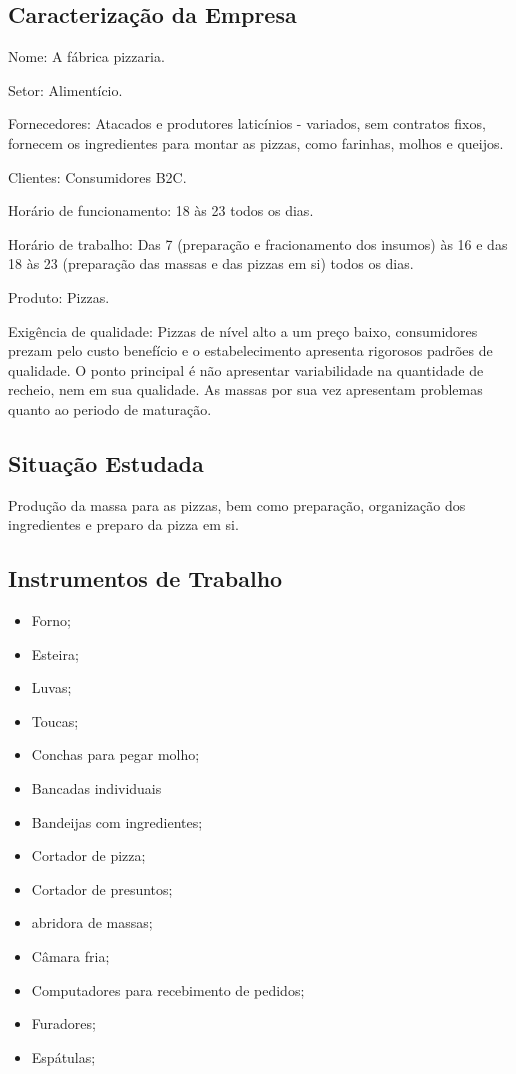 \documentclass[11pt]{article}
\begin{document}
\subsection{Caracterização da Empresa}

Nome: A fábrica pizzaria.

Setor: Alimentício.


Fornecedores: Atacados e produtores laticínios - variados, sem contratos fixos, fornecem os ingredientes para montar as pizzas, como farinhas, molhos e queijos.

Clientes: Consumidores B2C.

Horário de funcionamento: 18 às 23 todos os dias. 

Horário de trabalho: Das 7 (preparação e fracionamento dos insumos) às 16 e  das 18 às 23 (preparação das massas e das pizzas em si) todos os dias.

Produto: Pizzas.

Exigência de qualidade: Pizzas de nível alto a um preço baixo, consumidores prezam pelo custo benefício e o estabelecimento apresenta rigorosos padrões de qualidade. O ponto principal é não apresentar variabilidade na quantidade de recheio, nem em sua qualidade. As massas por sua vez apresentam problemas quanto ao periodo de maturação. 


\subsection{Situação Estudada}

Produção da massa para as pizzas, bem como preparação, organização dos ingredientes e preparo da pizza em si.


\subsection{Instrumentos de Trabalho}

\begin{itemize}
    \item Forno; 
    \item Esteira;
    \item Luvas;
    \item Toucas;
    \item Conchas para pegar molho;
    \item Bancadas individuais
    \item Bandeijas com ingredientes;
    \item Cortador de pizza;
    \item Cortador de presuntos;
    \item abridora de massas;
    \item Câmara fria;
    \item Computadores para recebimento de pedidos;
    \item Furadores; 
    \item Espátulas;
  \end{itemize}
\end{document}
